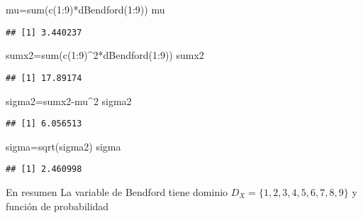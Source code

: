 \documentclass[
]{article}
\newenvironment{Shaded}{\begin{snugshade}}{\end{snugshade}}
\newcommand{\DecValTok}[1]{\textcolor[rgb]{0.00,0.00,0.81}{#1}}
\newcommand{\FunctionTok}[1]{\textcolor[rgb]{0.00,0.00,0.00}{#1}}
\newcommand{\NormalTok}[1]{#1}
\newcommand{\OtherTok}[1]{\textcolor[rgb]{0.56,0.35,0.01}{#1}}
\newcommand{\SpecialCharTok}[1]{\textcolor[rgb]{0.00,0.00,0.00}{#1}}
\begin{document}
\begin{Shaded}
\begin{Highlighting}[]
\NormalTok{mu}\OtherTok{=}\FunctionTok{sum}\NormalTok{(}\FunctionTok{c}\NormalTok{(}\DecValTok{1}\SpecialCharTok{:}\DecValTok{9}\NormalTok{)}\SpecialCharTok{*}\FunctionTok{dBendford}\NormalTok{(}\DecValTok{1}\SpecialCharTok{:}\DecValTok{9}\NormalTok{))}
\NormalTok{mu}
\end{Highlighting}
\end{Shaded}

\begin{verbatim}
## [1] 3.440237
\end{verbatim}

\begin{Shaded}
\begin{Highlighting}[]
\NormalTok{sumx2}\OtherTok{=}\FunctionTok{sum}\NormalTok{(}\FunctionTok{c}\NormalTok{(}\DecValTok{1}\SpecialCharTok{:}\DecValTok{9}\NormalTok{)}\SpecialCharTok{\^{}}\DecValTok{2}\SpecialCharTok{*}\FunctionTok{dBendford}\NormalTok{(}\DecValTok{1}\SpecialCharTok{:}\DecValTok{9}\NormalTok{))}
\NormalTok{sumx2}
\end{Highlighting}
\end{Shaded}

\begin{verbatim}
## [1] 17.89174
\end{verbatim}

\begin{Shaded}
\begin{Highlighting}[]
\NormalTok{sigma2}\OtherTok{=}\NormalTok{sumx2}\SpecialCharTok{{-}}\NormalTok{mu}\SpecialCharTok{\^{}}\DecValTok{2}
\NormalTok{sigma2}
\end{Highlighting}
\end{Shaded}

\begin{verbatim}
## [1] 6.056513
\end{verbatim}

\begin{Shaded}
\begin{Highlighting}[]
\NormalTok{sigma}\OtherTok{=}\FunctionTok{sqrt}\NormalTok{(sigma2)}
\NormalTok{sigma}
\end{Highlighting}
\end{Shaded}

\begin{verbatim}
## [1] 2.460998
\end{verbatim}

En resumen La variable de Bendford tiene dominio
\(D_X=\{1,2,3,4,5,6,7,8,9\}\) y función de probabilidad
\end{document}
